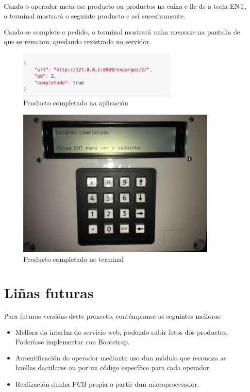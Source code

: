 \documentclass[11pt,twoside]{book}
\begin{document}
Cando o operador meta ese producto ou productos na caixa e lle de a tecla ENT, o terminal mostrará o seguinte producto e así sucesivamente.

Cando se complete o pedido, o terminal mostrará unha mensaxe na pantalla de que se rematou, quedando rexistrado no servidor.
\begin{figure}[H]
	\begin{center}
		\includegraphics[width=8cm]{images/API_modificada.png}
	\end{center}
	\caption{Producto completado na aplicación}
	\label{fig:Encargo1}
\end{figure}
\begin{figure}[H]
	\begin{center}
		\includegraphics[width=10cm]{images/encargo_completado.JPG}
	\end{center}
	\caption{Producto completado no terminal}
	\label{fig:Encargo1}
\end{figure}

\chapter{Liñas futuras}

Para futuras versións deste proxecto, contémplanse as seguintes melloras:

\begin{itemize}
    \item Mellora da interfaz do servicio web, podendo subir fotos dos productos. Poderíase implementar con Bootstrap.
    \item Autentificación do operador mediante uso dun módulo que reconoza as huellas dactilares ou por un código específico para cada operador.
    \item Realización dunha PCB propia a partir dun microprocesador.
\end{itemize}
\end{document}
